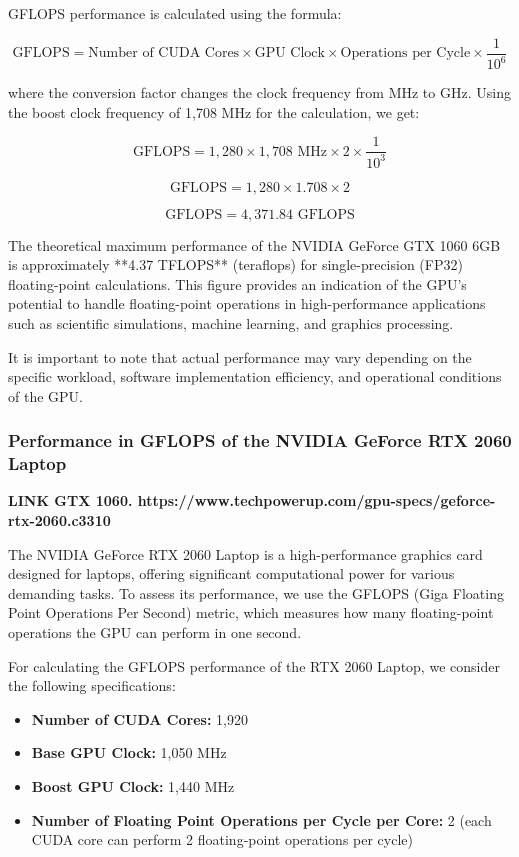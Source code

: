 
GFLOPS performance is calculated using the formula:

\[
\text{GFLOPS} = \text{Number of CUDA Cores} \times \text{GPU Clock} \times \text{Operations per Cycle} \times \frac{1}{10^6}
\]

where the conversion factor changes the clock frequency from MHz to GHz. Using the boost clock frequency of 1,708 MHz for the calculation, we get:

\[
\text{GFLOPS} = 1,280 \times 1,708 \text{ MHz} \times 2 \times \frac{1}{10^3}
\]

\[
\text{GFLOPS} = 1,280 \times 1.708 \times 2
\]

\[
\text{GFLOPS} = 4,371.84 \text{ GFLOPS}
\]


The theoretical maximum performance of the NVIDIA GeForce GTX 1060 6GB is approximately **4.37 TFLOPS** (teraflops) for single-precision (FP32) floating-point calculations. This figure provides an indication of the GPU's potential to handle floating-point operations in high-performance applications such as scientific simulations, machine learning, and graphics processing.

It is important to note that actual performance may vary depending on the specific workload, software implementation efficiency, and operational conditions of the GPU.

\subsubsection{Performance in GFLOPS of the NVIDIA GeForce RTX 2060 Laptop}

\textbf{LINK GTX 1060. https://www.techpowerup.com/gpu-specs/geforce-rtx-2060.c3310}

The NVIDIA GeForce RTX 2060 Laptop is a high-performance graphics card designed for laptops, offering significant computational power for various demanding tasks. To assess its performance, we use the GFLOPS (Giga Floating Point Operations Per Second) metric, which measures how many floating-point operations the GPU can perform in one second.


For calculating the GFLOPS performance of the RTX 2060 Laptop, we consider the following specifications:

\begin{itemize}
    \item \textbf{Number of CUDA Cores:} 1,920
    \item \textbf{Base GPU Clock:} 1,050 MHz
    \item \textbf{Boost GPU Clock:} 1,440 MHz
    \item \textbf{Number of Floating Point Operations per Cycle per Core:} 2 (each CUDA core can perform 2 floating-point operations per cycle)
\end{itemize}

